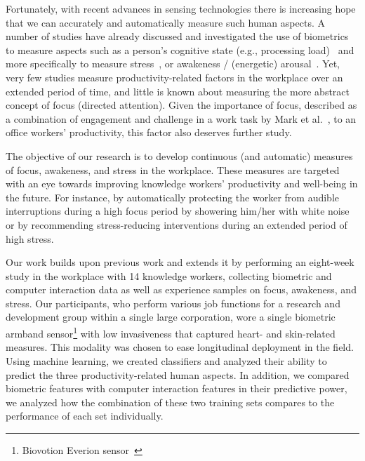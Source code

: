 Fortunately, with recent advances in sensing technologies there is increasing hope that we can accurately and automatically measure such human aspects. A number of studies have already discussed and investigated the use of biometrics to measure aspects such as a person's cognitive state 
(e.g., processing load)~\cite{beatty82,Kramer90,richter1998psychophysiological,Rowe98,Wilson2002} 
and more specifically to measure stress~\cite{dishman2000stress,Setz2010}, 
or awakeness / (energetic) arousal~\cite{exler2016tired,mcduff2012affectaura,haag2004emotion}. Yet, very few 
studies measure productivity-related factors in the workplace over an 
extended period of time, and little is known about measuring the more 
abstract concept of focus (directed attention). 
Given the importance of focus, described as a 
combination of engagement and challenge in a work task by Mark et al.~\cite{mark2014bored}, to an office workers' productivity, this factor also 
deserves further study. 

The objective of our research is to develop continuous (and automatic) measures of focus, awakeness, and stress in the workplace. These measures are targeted with an eye towards improving knowledge workers' productivity and well-being in the future. For instance, by automatically protecting the worker from audible interruptions during a high focus period by showering him/her with white noise or by recommending stress-reducing interventions during an extended period of high stress. 

Our work builds upon previous work and extends it by performing an eight-week study in the workplace with 14 knowledge workers, collecting biometric and computer interaction data as well as experience samples on focus, awakeness, and stress. Our participants, who perform various job functions for a research and development group within a single large corporation, wore a single biometric armband sensor\footnote{Biovotion Everion sensor~\cite{everion}} with low invasiveness that captured heart- and skin-related measures. This modality was chosen to ease longitudinal deployment in the field. Using machine learning, we created classifiers and analyzed their ability to predict the three productivity-related human aspects. In addition, we compared biometric features with computer interaction features in their predictive power, we analyzed how the combination
of these two training sets compares to the performance of each
set individually.

